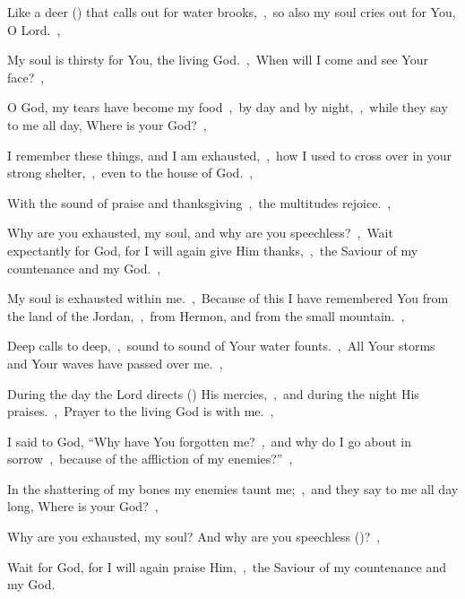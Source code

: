 \documentclass[12pt,twoside,a5paper]{article}
\begin{document}
\begin{normalparskip}
  Like a deer () that calls out for water brooks,~\sep\ so also my soul cries out for You, O Lord.~\sep


  My soul is thirsty for You, the living God.~\sep\ When will I come and see Your face?~\sep

  O God, my tears have become my food~\sep\ by day and by night,~\sep\ while they say to me all day, Where is your God?~\sep

  I remember these things, and I am exhausted,~\sep\ how I used to cross over in your strong shelter,~\sep\ even to the house of God.~\sep

  With the sound of praise and thanksgiving~\sep\ the multitudes rejoice.~\sep

  Why are you exhausted, my soul, and why are you speechless?~\sep\ Wait expectantly for God, for I will again give Him thanks,~\sep\ the Saviour of my countenance and my God.~\sep

  My soul is exhausted within me.~\sep\ Because of this I have remembered You from the land of the Jordan,~\sep\ from Hermon, and from the small mountain.~\sep

  Deep calls to deep,~\sep\ sound to sound of Your water founts.~\sep\ All Your storms and Your waves have passed over me.~\sep

  During the day the Lord directs () His mercies,~\sep\ and during the night His praises.~\sep\ Prayer to the living God is with me.~\sep

  I said to God, ``Why have You forgotten me?~\sep\ and why do I go about in sorrow~\sep\ because of the affliction of my enemies?''~\sep

  In the shattering of my bones my enemies taunt me;~\sep\ and they say to me all day long, Where is your God?~\sep

  Why are you exhausted, my soul? And why are you speechless ()?~\sep

  Wait for God, for I will again praise Him,~\sep\ the Saviour of my countenance and my God.
\end{normalparskip}

\end{document}
